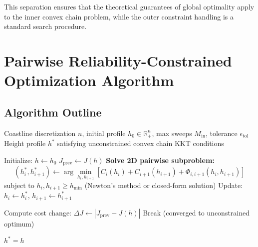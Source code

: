 \documentclass[12pt]{article}
\theoremstyle{definition}
\begin{document}
This separation ensures that the theoretical guarantees of global optimality apply to the inner convex chain problem, while the outer constraint handling is a standard search procedure.

\section{Pairwise Reliability-Constrained Optimization Algorithm}

\subsection{Algorithm Outline}

\begin{algorithm}[H]
\caption{Pairwise Convex Chain Optimization (Inner Loop)}
\label{alg:pairwise_inner}
\begin{algorithmic}[1]
\Require Coastline discretization $n$, initial profile $h_0 \in \mathbb{R}^n_+$, max sweeps $M_{\text{in}}$, tolerance $\epsilon_{\text{tol}}$
\Ensure Height profile $h^*$ satisfying unconstrained convex chain KKT conditions

\State Initialize: $h \leftarrow h_0$
    \State $J_{\text{prev}} \leftarrow J(h)$
        \State \textbf{Solve 2D pairwise subproblem:}
        \[
        (h_i^*, h_{i+1}^*) \leftarrow \arg\min_{h_i, h_{i+1}} \left[ C_i(h_i) + C_{i+1}(h_{i+1}) + \Phi_{i,i+1}(h_i, h_{i+1}) \right]
        \]
        subject to $h_i, h_{i+1} \geq h_{\min}$ (Newton's method or closed-form solution)
        \State Update: $h_i \leftarrow h_i^*$, $h_{i+1} \leftarrow h_{i+1}^*$
    \EndFor

    \State Compute cost change: $\Delta J \leftarrow |J_{\text{prev}} - J(h)|$
        \State Break (converged to unconstrained optimum)
    \EndIf
\EndFor

\Return $h^*= h$
\end{algorithmic}
\end{algorithm}
\end{document}

